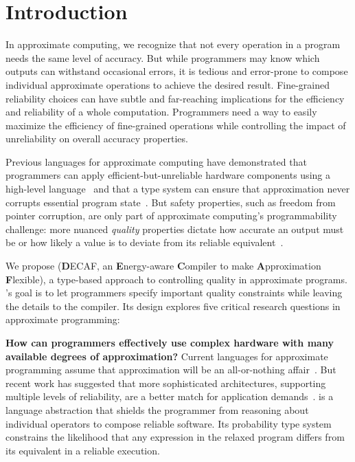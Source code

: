 


\section{Introduction}

In approximate computing, we recognize that not every operation in a program
needs the same level of accuracy.
But while programmers may know which outputs can withstand occasional errors,
it is tedious and error-prone to compose individual approximate operations to
achieve the desired result.
Fine-grained reliability choices can have subtle and far-reaching implications
for the efficiency and reliability of a whole computation.
Programmers need a way to easily maximize the efficiency of fine-grained
operations while controlling the impact of unreliability on overall accuracy
properties.

Previous languages for approximate computing
have demonstrated that programmers can apply efficient-but-unreliable hardware components using a high-level
language~\cite{rely, energytypes}
and that a type system can ensure that approximation never corrupts essential
program state~\cite{enerj}.
But safety properties, such as freedom from pointer corruption, are only part
of approximate computing's programmability challenge:
more nuanced \emph{quality} properties dictate how accurate an output
must be or how likely a value is to deviate from its reliable equivalent~\cite{passert, rely}.

We propose \lang (\textbf{D}ECAF, an \textbf{E}nergy-aware \textbf{C}ompiler
to make \textbf{A}pproximation \textbf{F}lexible), a type-based approach
to controlling quality in approximate programs.
\lang's goal is to let programmers specify important quality constraints while
leaving the details to the compiler.
Its design explores five critical research questions in approximate
programming:

\textbf{How can programmers effectively use complex hardware with many
available degrees of approximation?}
Current languages for approximate programming assume that approximation
will be an all-or-nothing affair~\cite{enerj, rely, chisel}.
But recent work has suggested that more sophisticated architectures,
supporting
multiple levels of reliability, are a better match for
application demands~\cite{quora}.
\lang is a language abstraction that shields the programmer from reasoning
about individual operators to compose reliable software.
Its probability type system constrains the likelihood that any expression in
the relaxed program differs from its equivalent in a reliable execution.

